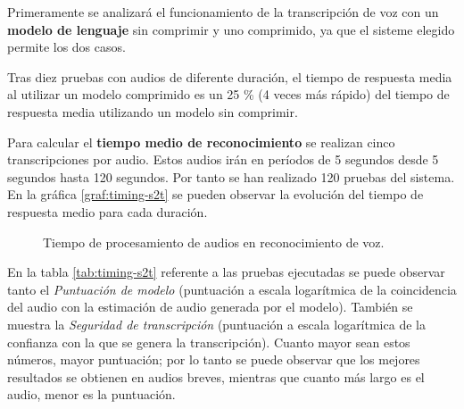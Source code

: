 \documentclass[../main.tex]{subfiles}
\begin{document}
Primeramente se analizará el funcionamiento de la transcripción de voz con un \textbf{modelo de lenguaje} sin comprimir y uno comprimido, ya que el sisteme elegido permite los dos casos.

Tras diez pruebas con audios de diferente duración, el tiempo de respuesta media al utilizar un modelo comprimido es un 25 \% (4 veces más rápido) del tiempo de respuesta media utilizando un modelo sin comprimir.

Para calcular el \textbf{tiempo medio de reconocimiento} se realizan cinco transcripciones por audio. Estos audios irán en períodos de 5 segundos desde 5 segundos hasta 120 segundos. Por tanto se han realizado 120 pruebas del sistema. En la gráfica \autoref{graf:timing-s2t} se pueden observar la evolución del tiempo de respuesta medio para cada duración.

\begin{figure}[H]
  \begin{center}
    \caption{Tiempo de procesamiento de audios en reconocimiento de voz.}
    \label{graf:timing-s2t}
  \end{center}
\end{figure}

En la tabla \autoref{tab:timing-s2t} referente a las pruebas ejecutadas se puede observar tanto el \textit{Puntuación de modelo} (puntuación a escala logarítmica de la coincidencia del audio con la estimación de audio generada por el modelo). También se muestra la \textit{Seguridad de transcripción} (puntuación a escala logarítmica de la confianza con la que se genera la transcripción). Cuanto mayor sean estos números, mayor puntuación; por lo tanto se puede observar que los mejores resultados se obtienen en audios breves, mientras que cuanto más largo es el audio, menor es la puntuación.
\end{document}
